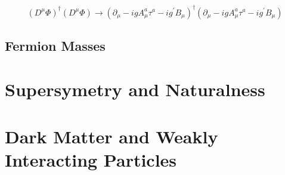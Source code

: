 \begin{equation}
\label{eq:HiggsMass}
(D^{\mu}\Phi)^{\dagger}(D^{\mu}\Phi) \rightarrow (\partial_{\mu}
-igA_{\mu}^{a}\tau^{a} - ig^{\prime}B_{\mu})^{\dagger}(\partial_{\mu}
-igA_{\mu}^{a}\tau^{a} - ig^{\prime}B_{\mu}) 
\end{equation}
\section{Fermion Masses}\label{yukawa}
\chapter{Supersymetry and Naturalness}
\chapter{Dark Matter and Weakly Interacting Particles}


